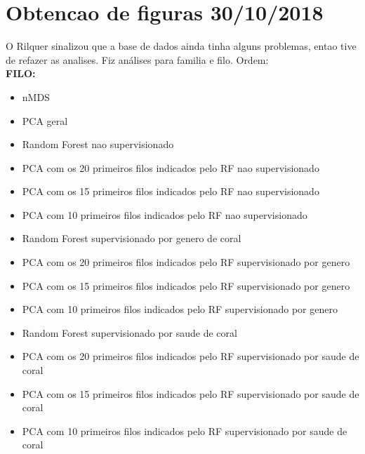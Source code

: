 \documentclass[12pt, a4paper]{report}
\begin{document}
\section{Obtencao de figuras 30/10/2018}
O Rilquer sinalizou que a base de dados ainda tinha alguns problemas, entao tive de refazer as analises. Fiz análises para familia e filo. Ordem: \\
\textbf{FILO:}
\begin{itemize}
\item nMDS 
\item PCA geral
\item Random Forest nao supervisionado
\item PCA com os 20 primeiros filos indicados pelo RF nao supervisionado
\item PCA com os 15 primeiros filos  indicados pelo RF nao supervisionado
\item PCA com 10 primeiros filos  indicados pelo RF nao supervisionado
\item Random Forest supervisionado por genero de coral
\item PCA com os 20 primeiros filos  indicados pelo RF supervisionado por genero
\item PCA com os 15 primeiros filos  indicados pelo RF supervisionado por genero
\item PCA com 10 primeiros filos  indicados pelo RF supervisionado por genero
\item Random Forest supervisionado por saude de coral
\item PCA com os 20 primeiros filos  indicados pelo RF supervisionado por saude de coral
\item PCA com os 15 primeiros filos  indicados pelo RF supervisionado por saude de coral
\item PCA com 10 primeiros filos  indicados pelo RF supervisionado por saude de coral
\end{itemize}
\end{document}

